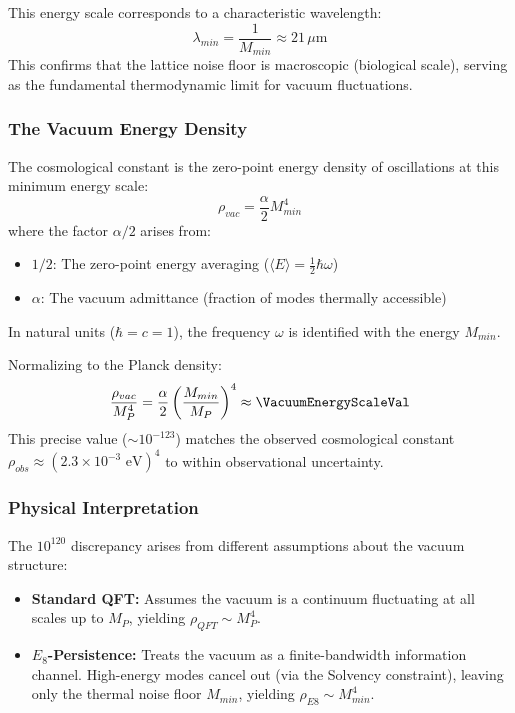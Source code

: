 This energy scale corresponds to a characteristic wavelength:
\begin{equation}
    \lambda_{min} = \frac{1}{M_{min}} \approx 21 \, \mu\text{m}
\end{equation}
This confirms that the lattice noise floor is macroscopic (biological scale), serving as the fundamental thermodynamic limit for vacuum fluctuations.

\subsubsection{The Vacuum Energy Density}
The cosmological constant is the zero-point energy density of oscillations at this minimum energy scale:
\begin{equation}
    \rho_{vac} = \frac{\alpha}{2} M_{min}^4
\end{equation}
where the factor $\alpha/2$ arises from:
\begin{itemize}
    \item $1/2$: The zero-point energy averaging 
    ($\langle E \rangle = \frac{1}{2}\hbar\omega$)
    \item $\alpha$: The vacuum admittance (fraction of modes thermally accessible)
\end{itemize}
In natural units ($\hbar=c=1$), the frequency $\omega$ is identified with the energy $M_{min}$.

Normalizing to the Planck density:
\begin{equation}
    \frac{\rho_{vac}}{M_P^4} = \frac{\alpha}{2} \left(\frac{M_{min}}{M_P}\right)^4 
    \approx \VacuumEnergyScaleVal
\end{equation}
This precise value ($\sim 10^{-123}$) matches the observed cosmological constant $\rho_{obs} \approx (2.3 \times 10^{-3} \text{ eV})^4$ to within observational uncertainty.

\subsubsection{Physical Interpretation}
The $10^{120}$ discrepancy arises from different assumptions about the vacuum structure:
\begin{itemize}
    \item \textbf{Standard QFT:} Assumes the vacuum is a continuum fluctuating at all scales up to $M_P$, yielding $\rho_{QFT} \sim M_P^4$.
    \item \textbf{$E_8$-Persistence:} Treats the vacuum as a finite-bandwidth information channel. High-energy modes cancel out (via the Solvency constraint), leaving only the thermal noise floor $M_{min}$, yielding $\rho_{E8} \sim M_{min}^4$.
\end{itemize}

